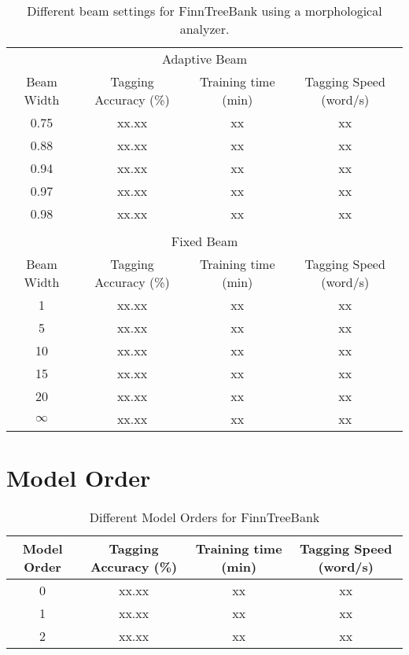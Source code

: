 \begin{table}[htb!]
\begin{center}
\begin{tabular}{cccc}
\multicolumn{4}{c}{Adaptive Beam}\\
Beam Width & Tagging Accuracy (\%) & Training time (min) & Tagging Speed (word/s)\\
\hline
0.75       & xx.xx            & xx            & xx            \\
0.88       & xx.xx            & xx            & xx            \\
0.94       & xx.xx            & xx            & xx            \\
0.97       & xx.xx            & xx            & xx            \\
0.98       & xx.xx            & xx            & xx            \\
\hline
           &                  &               &               \\
\multicolumn{4}{c}{Fixed Beam}\\
Beam Width & Tagging Accuracy (\%) & Training time (min) & Tagging Speed (word/s) \\
\hline
1        & xx.xx            & xx            & xx            \\
5        & xx.xx            & xx            & xx            \\
10       & xx.xx            & xx            & xx            \\
15       & xx.xx            & xx            & xx            \\
20       & xx.xx            & xx            & xx            \\
$\infty$       & xx.xx            & xx            & xx            \\
\hline
\end{tabular}
\caption{Different beam settings for FinnTreeBank using a morphological analyzer.}
\end{center}
\end{table}

\section{Model Order}

\begin{table}[htb!]
\begin{center}
\begin{tabular}{cccc}
Model Order & Tagging Accuracy (\%) & Training time (min) & Tagging Speed (word/s)\\
\hline
0        & xx.xx            & xx            & xx            \\
1        & xx.xx            & xx            & xx            \\
2        & xx.xx            & xx            & xx            \\
\hline
\end{tabular}
\caption{Different Model Orders for FinnTreeBank}
\end{center}
\end{table}

